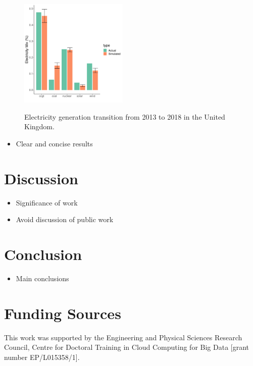 \documentclass[final,3p,times,twocolumn,numbers]{elsarticle}
\begin{document}
\begin{figure}
\centering
\includegraphics[width=0.46\textwidth]{figures/results/best_run.pdf}
\label{uk_historical_mix}
\caption{Electricity generation transition from 2013 to 2018 in the United Kingdom.}
\end{figure}

\begin{itemize}
	\item Clear and concise results
\end{itemize}

\section{Discussion}
\label{sec:discussion}

\begin{itemize}
	\item Significance of work
	\item Avoid discussion of public work
\end{itemize}

\section{Conclusion}
\label{sec:conclusion}

\begin{itemize}
	\item Main conclusions
\end{itemize}

\section{Funding Sources}

This work was supported by the Engineering and Physical Sciences Research Council, Centre for Doctoral Training in Cloud Computing for Big Data [grant number EP/L015358/1].
\end{document}
